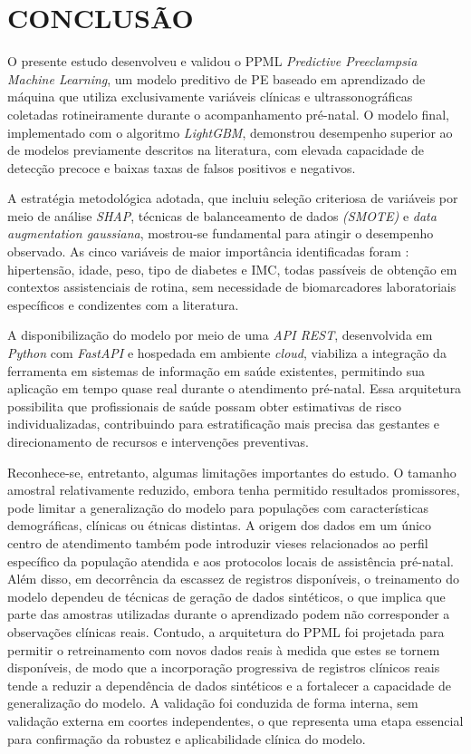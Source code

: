 \documentclass[12pt, a4paper]{report}
\theoremstyle{definition}
\theoremstyle{remark}
\theoremstyle{plain}
\begin{document}
\chapter{CONCLUSÃO}
\thispagestyle{myheadings}

O presente estudo desenvolveu e validou o PPML \textit{Predictive Preeclampsia Machine Learning}, um modelo preditivo de PE baseado em aprendizado de máquina que utiliza exclusivamente variáveis clínicas e ultrassonográficas coletadas rotineiramente durante o acompanhamento pré-natal. O modelo final, implementado com o algoritmo \textit{LightGBM}, demonstrou desempenho superior ao de modelos previamente descritos na literatura, com elevada capacidade de detecção precoce e baixas taxas de falsos positivos e negativos.

A estratégia metodológica adotada, que incluiu seleção criteriosa de variáveis por meio de análise \textit{SHAP}, técnicas de balanceamento de dados \textit{(SMOTE)} e \textit{data augmentation gaussiana}, mostrou-se fundamental para atingir o desempenho observado. As cinco variáveis de maior importância identificadas foram : hipertensão, idade, peso, tipo de diabetes e IMC, todas passíveis de obtenção em contextos assistenciais de rotina, sem necessidade de biomarcadores laboratoriais específicos e condizentes com a literatura.

A disponibilização do modelo por meio de uma \textit{API REST}, desenvolvida em \textit{Python} com \textit{FastAPI} e hospedada em ambiente \textit{cloud}, viabiliza a integração da ferramenta em sistemas de informação em saúde existentes, permitindo sua aplicação em tempo quase real durante o atendimento pré-natal. Essa arquitetura possibilita que profissionais de saúde possam obter estimativas de risco individualizadas, contribuindo para estratificação mais precisa das gestantes e direcionamento de recursos e intervenções preventivas.

Reconhece-se, entretanto, algumas limitações importantes do estudo. O tamanho amostral relativamente reduzido, embora tenha permitido resultados promissores, pode limitar a generalização do modelo para populações com características demográficas, clínicas ou étnicas distintas. A origem dos dados em um único centro de atendimento também pode introduzir vieses relacionados ao perfil específico da população atendida e aos protocolos locais de assistência pré-natal. Além disso, em decorrência da escassez de registros disponíveis, o treinamento do modelo dependeu de técnicas de geração de dados sintéticos, o que implica que parte das amostras utilizadas durante o aprendizado podem não corresponder a observações clínicas reais. Contudo, a arquitetura do PPML foi projetada para permitir o retreinamento com novos dados reais à medida que estes se tornem disponíveis, de modo que a incorporação progressiva de registros clínicos reais tende a reduzir a dependência de dados sintéticos e a fortalecer a capacidade de generalização do modelo. A validação foi conduzida de forma interna, sem validação externa em coortes independentes, o que representa uma etapa essencial para confirmação da robustez e aplicabilidade clínica do modelo.
\end{document}
